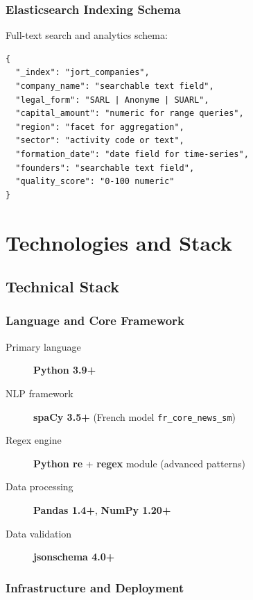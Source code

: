 \documentclass[12pt,a4paper]{report}
\begin{document}
\subsection{Elasticsearch Indexing Schema}

Full-text search and analytics schema:

\begin{verbatim}
{
  "_index": "jort_companies",
  "company_name": "searchable text field",
  "legal_form": "SARL | Anonyme | SUARL",
  "capital_amount": "numeric for range queries",
  "region": "facet for aggregation",
  "sector": "activity code or text",
  "formation_date": "date field for time-series",
  "founders": "searchable text field",
  "quality_score": "0-100 numeric"
}
\end{verbatim}

\chapter{Technologies and Stack}

\section{Technical Stack}

\subsection{Language and Core Framework}

\begin{description}
    \item[Primary language] \textbf{Python 3.9+}
    \item[NLP framework] \textbf{spaCy 3.5+} (French model \texttt{fr\_core\_news\_sm})
    \item[Regex engine] \textbf{Python re} + \textbf{regex} module (advanced patterns)
    \item[Data processing] \textbf{Pandas 1.4+}, \textbf{NumPy 1.20+}
    \item[Data validation] \textbf{jsonschema 4.0+}
\end{description}

\subsection{Infrastructure and Deployment}
\end{document}
